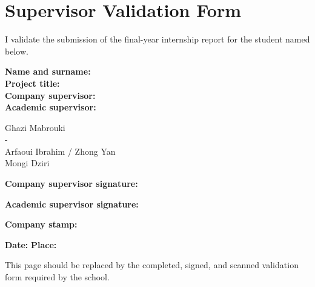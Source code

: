 \chapter*{Supervisor Validation Form}

\noindent I validate the submission of the final-year internship report for the student named below.

\vspace{1cm}
\noindent
\begin{minipage}[t]{0.30\textwidth}
\textbf{Name and surname:}\\[0.2cm]
\textbf{Project title:}\\[0.2cm]
\textbf{Company supervisor:}\\[0.2cm]
\textbf{Academic supervisor:}
\end{minipage}%
\begin{minipage}[t]{0.66\textwidth}
Ghazi Mabrouki\\[0.2cm]
\project{} - \projectlong{}\\[0.2cm]
Arfaoui Ibrahim / Zhong Yan\\[0.2cm]
Mongi Dziri
\end{minipage}

\vspace{2cm}
\noindent\textbf{Company supervisor signature:} \hrulefill

\vspace{0.8cm}
\noindent\textbf{Academic supervisor signature:} \hrulefill

\vspace{0.8cm}
\noindent\textbf{Company stamp:} \hrulefill

\vspace{0.8cm}
\noindent\textbf{Date:} \hrulefill \hfill \textbf{Place:} \hrulefill

\vfill
\noindent This page should be replaced by the completed, signed, and scanned validation form required by the school.

